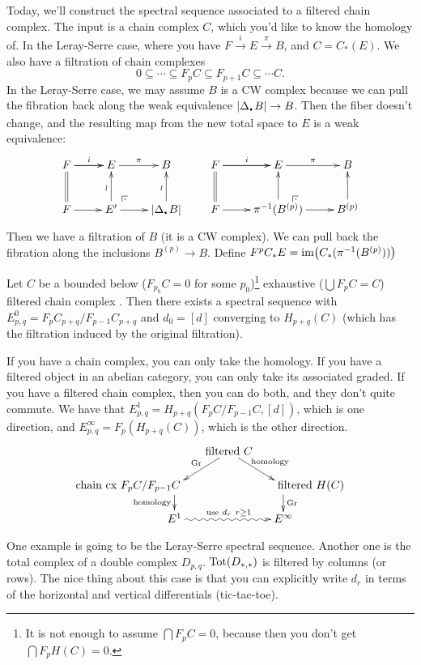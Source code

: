 Today, we'll construct the spectral sequence associated to a filtered chain complex. The input is a chain complex $C$, which you'd like to know the homology of. In the Leray-Serre case, where you have $F\xrightarrow i E\xrightarrow\pi B$, and $C=C_*(E)$. We also have a filtration of chain complexes
\[
 0\subseteq \cdots \subseteq F_pC\subseteq F_{p+1}C\subseteq \cdots C.
\]
In the Leray-Serre case, we may assume $B$ is a CW complex because we can pull the fibration back along the weak equivalence $|\Delta_\udot B|\to B$. Then the fiber doesn't change, and the resulting map from the new total space to $E$ is a weak equivalence:
\[\xymatrix{
 F\ar[r]^i \ar@{=}[d] \ar[r] & E \ar[r]^{\pi} & B\\
 F \ar[r] & E'\ar@{}[ur]|(.25)\pd \ar[r]\ar[u]^\wr & |\Delta_\udot B|\ar[u]^\wr
}\qquad
\xymatrix{
 F\ar[r]^i \ar@{=}[d] \ar[r] & E \ar[r]^{\pi} & B\\
 F \ar[r] & \pi^{-1}(B^{(p)})\ar@{}[ur]|(.25)\pd \ar[r]\ar[u] & B^{(p)}\ar[u]
}\]
Then we have a filtration of $B$ (it is a CW complex). We can pull back the fibration along the inclusions $B^{(p)}\to B$. Define $F^pC_*E=\operatorname{im} \bigl(C_*(\pi^{-1}(B^{(p)}))\bigr)$
\begin{theorem}
 Let $C$ be a bounded below ($F_{p_0}C=0$ for some $p_0$)\footnote{It is not enough to assume $\bigcap F_p C=0$, because then you don't get $\bigcap F_pH(C)=0$.} exhaustive ($\bigcup F_p C=C$) filtered chain complex . Then there exists a spectral sequence with $E^0_{p,q}=F_pC_{p+q}/F_{p-1}C_{p+q}$ and $d_0=[d]$ converging to $H_{p+q}(C)$ (which has the filtration induced by the original filtration).
\end{theorem}
If you have a chain complex, you can only take the homology. If you have a filtered object in an abelian category, you can only take its associated graded. If you have a filtered chain complex, then you can do both, and they don't quite commute. We have that $E^1_{p,q}=H_{p+q}(F_pC/F_{p-1}C, [d])$, which is one direction, and $E^{\infty}_{p,q}=F_p(H_{p+q}(C))$, which is the other direction.
\[\xymatrix@!0 @C+2pc @R+.5pc{
 & \text{filtered }C\ar[dr]^{\text{homology}}\ar[dl]_{\text{Gr}}\\
 **[l]\text{chain cx }F_pC/F_{p-1}C \ar[d]_{\text{homology}} & & **[r] \text{filtered }H(C)\ar[d]^{\text{Gr}}\\
 E^1\ar@{~>}[rr]^{\text{use }d_r\ r\ge 1} & & E^\infty
}\]

One example is going to be the Leray-Serre spectral sequence. Another one is the total complex of a double complex $D_{p,q}$. $\operatorname{Tot}(D_{*,*})$ is filtered by columns (or rows). The nice thing about this case is that you can explicitly write $d_r$ in terms of the horizontal and vertical differentials (tic-tac-toe).

